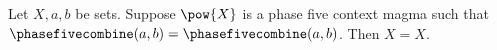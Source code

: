 

\begin{proposition}\label{notion_structure_term_receiver_missing}
    Let $X,a,b$ be sets.
    Suppose $\pow{X}$ is a phase five context magma such that
        $\phasefivecombine(a,b)=\phasefivecombine(a,b)$.
    Then $X=X$.
\end{proposition}
